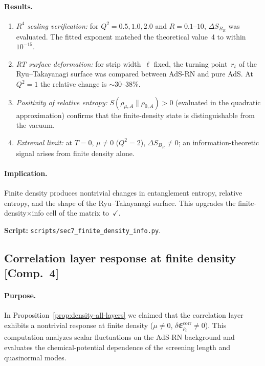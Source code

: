 \documentclass[
  aps,
  prd,
  preprint,
  groupedaddress,
  nofootinbib,
  longbibliography
]{revtex4-2}
\theoremstyle{remark}
\begin{document}
\paragraph{Results.}
\begin{enumerate}
\item \emph{$R^4$ scaling verification:}
  for $Q^2=0.5,1.0,2.0$ and $R=0.1$--$10$,
  $\Delta S_{B_R}$ was evaluated.
  The fitted exponent matched the theoretical value~4 to within
  $10^{-15}$.
\item \emph{RT surface deformation:}
  for strip width~$\ell$ fixed, the turning point~$r_t$ of the
  Ryu--Takayanagi surface was compared between AdS-RN and pure
  AdS.
  At $Q^2=1$ the relative change is $\sim 30$--$38\%$.
\item \emph{Positivity of relative entropy:}
  $S(\rho_{\mu,A}\|\rho_{0,A})>0$ (evaluated in the quadratic
  approximation) confirms that the finite-density state is
  distinguishable from the vacuum.
\item \emph{Extremal limit:}
  at $T=0$, $\mu\neq 0$ ($Q^2=2$),
  $\Delta S_{B_R}\neq 0$; an information-theoretic signal arises
  from finite density alone.
\end{enumerate}

\paragraph{Implication.}
Finite density produces nontrivial changes in entanglement
entropy, relative entropy, and the shape of the
Ryu--Takayanagi surface.
This upgrades the finite-density$\times$info cell of the matrix
to~$\checkmark$.

\noindent\textbf{Script:}
\texttt{scripts/sec7\_finite\_density\_info.py}.

\subsection{Correlation layer response at finite density
  [Comp.~4]}\label{app:A4}

\paragraph{Purpose.}
In Proposition~\ref{prop:density-all-layers} we claimed that the
correlation layer exhibits a nontrivial response at finite density
($\mu\neq 0$,
$\delta\mathfrak{E}_{\rho_0}^{\mathrm{corr}}\neq 0$).
This computation analyzes scalar fluctuations on the AdS-RN
background and evaluates the chemical-potential dependence of
the screening length and quasinormal modes.
\end{document}
